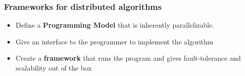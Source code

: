 \begin{frame}\frametitle{Frameworks for distributed algorithms}
  \begin{itemize}
   \item Define a \textbf{Programming Model} that is inherently parallelizable.
   \item Give an interface to the programmer to implement the algorithm
   \item Create a \textbf{framework} that runs the program and gives fault-tolerance and scalability out of the box
  \end{itemize}

\end{frame}




